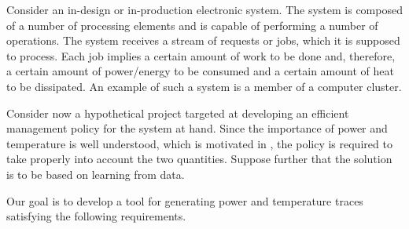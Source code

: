 Consider an in-design or in-production electronic system. The system is composed
of a number of processing elements and is capable of performing a number of
operations. The system receives a stream of requests or jobs, which it is
supposed to process. Each job implies a certain amount of work to be done and,
therefore, a certain amount of power/energy to be consumed and a certain amount
of heat to be dissipated. An example of such a system is a member of a computer
cluster.

Consider now a hypothetical project targeted at developing an efficient
management policy for the system at hand. Since the importance of power and
temperature is well understood, which is motivated in , the
policy is required to take properly into account the two quantities. Suppose
further that the solution is to be based on learning from data.

Our goal is to develop a tool for generating power and temperature traces
satisfying the following requirements.
